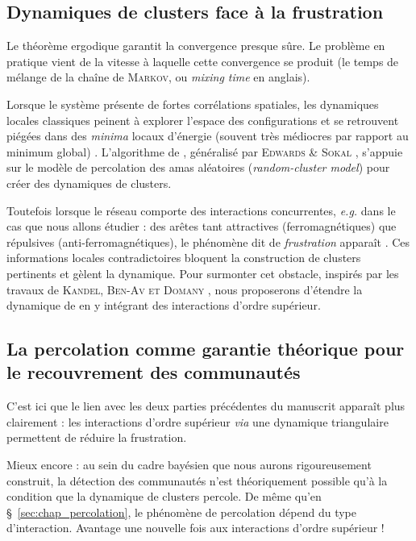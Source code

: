 \subsection{Dynamiques de clusters face à la frustration}

Le théorème ergodique garantit la convergence presque sûre. Le problème en pratique vient de la vitesse à laquelle cette convergence se produit \cite{Robert1996MCMC} (le temps de mélange de la chaîne de \textsc{Markov}, ou \emph{mixing time} en anglais). 

Lorsque le système présente de fortes corrélations spatiales, les dynamiques locales classiques peinent à explorer l'espace des configurations et se retrouvent piégées dans des \emph{minima} locaux d'énergie (souvent très médiocres par rapport au minimum global) \cite{CeleuxRobert2000PoorMixing}.
L'algorithme de \SW{} \cite{SwendsenWang}, généralisé par \textsc{Edwards \& Sokal} \cite{EdwardsSokal}, s'appuie sur le modèle de percolation des amas aléatoires (\emph{random-cluster model}) \cite{FortuinKasteleyn, Grimmett2006} pour créer des dynamiques de clusters. %

Toutefois lorsque le réseau comporte des interactions concurrentes, \emph{e.g.} dans le cas que nous allons étudier : des arêtes tant attractives (ferromagnétiques) que répulsives (anti-ferromagnétiques), le phénomène dit de \emph{frustration} apparaît \cite{FaiblesseSwendsen-WangFrustration, RevueSpinGlassesPercolation2024}. 
Ces informations locales contradictoires bloquent la construction de clusters pertinents et gèlent la dynamique. 
Pour surmonter cet obstacle, inspirés par les travaux de \textsc{Kandel, Ben-Av et Domany} \cite{KBD1992}, nous proposerons d'étendre la dynamique de \SW{} en y intégrant des interactions d'ordre supérieur. 

\subsection{La percolation comme garantie théorique pour le recouvrement des communautés}


C'est ici que le lien avec les deux parties précédentes du manuscrit apparaît plus clairement : les interactions d'ordre supérieur \emph{via} une dynamique triangulaire permettent de réduire la frustration.

Mieux encore : au sein du cadre bayésien que nous aurons rigoureusement construit, la détection des communautés n'est théoriquement possible qu'à la condition que la dynamique de clusters percole. De même qu'en \S~\ref{sec:chap_percolation}, le phénomène de percolation dépend du type d'interaction. Avantage une nouvelle fois aux interactions d'ordre supérieur !



